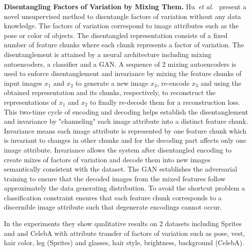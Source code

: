 \documentclass[12pt,a4paper]{article}
\begin{document}
\par \textbf{Disentangling Factors of Variation by Mixing Them.} Hu~\textit{et al.}~\cite{DisentFacOfVarByMixTh} present a novel unsupervised method to disentangle factors of variation without any data knowledge. The factors of variation correspond to image attributes such as the pose or color of objects. The disentangled representation consists of a fixed number of feature chunks where each chunk represents a factor of variation. The disentanglement is attained by a neural architecture including mixing autoencoders, a classifier and a GAN. A sequence of 2 mixing autoencoders is used to enforce disentanglement and invariance by mixing the feature chunks of input images $x_1$ and $x_2$ to generate a new image $x_3$, re-encode $x_3$ and using the obtained representation and its chunks, respectively, to reconstruct the representations of $x_1$ and $x_2$ to finally re-decode them for a reconstruction loss. This two-time cycle of encoding and decoding helps establish the disentanglement and invariance by "channeling" each image attribute into a distinct feature chunk. Invariance means each image attribute is represented by one feature chunk which is invariant to changes in other chunks and for the decoding part affects only one image attribute. Invariance allows the system after disentangled encoding to create mixes of factors of variation and decode them into new images semantically consistent with the dataset. The GAN establishes the adversarial training to ensure that the decoded images from the mixed features follow approximately the data generating distribution. To avoid the shortcut problem a classification constraint ensures that each feature chunk corresponds to a discernible image attribute such that degenerate encodings cannot occur.


In the experiments they show qualitative results on 2 datasets including Sprites and and CelebA with attribute transfer of factors of variation such as pose, vest, hair color, leg (Sprites) and glasses, hair style, brightness, background (CelebA).
\end{document}

